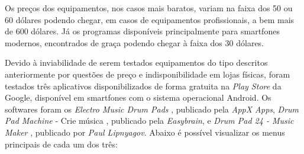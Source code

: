 \documentclass[12pt]{report}
\begin{document}
Os preços dos equipamentos, nos casos mais baratos, variam na faixa
dos 50 ou 60 dólares podendo chegar, em casos de equipamentos
profissionais, a bem mais de 600 dólares. Já os programas disponíveis
principalmente para smartfones modernos, encontrados de graça podendo
chegar à faixa dos 30 dólares.

Devido à inviabilidade de serem testados equipamentos do tipo descritos
anteriormente por questões de preço e indisponibilidade em lojas
físicas, foram testados três aplicativos disponibilizados de forma
gratuita na {\it Play Store} da Google, disponível em smartfones com
o sistema operacional Android. Os softwares foram os {\it Electro
  Music Drum Pads} \cite{app1}, publicado pela {\it AppX Apps}, {\it
  Drum Pad Machine} - Crie música \cite{app2}, publicado pela {\it
  Easybrain}, e {\it Drum Pad 24 - Music Maker} \cite{app3}, publicado
por {\it Paul Lipnyagov}. Abaixo é possível visualizar os menus
principais de cada um dos três:
\end{document}
